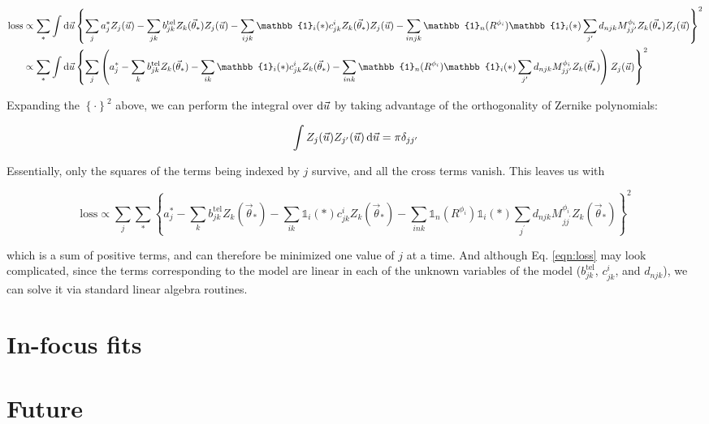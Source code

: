 \documentclass{article}
\begin{document}
\begin{equation}
\begin{align}
    \mathrm{loss}
    &\propto \sum_{\ast}
    \int \dif{\vec{u}} \left\{\sum_j a_j^\ast Z_j(\vec{u})
    - \sum_{jk} b^\mathrm{tel}_{jk} Z_k(\vec{\theta}_\ast) Z_j(\vec{u})
    - \sum_{ijk} \mathbb{1}_i(\ast) c^i_{jk} Z_k(\vec{\theta}_\ast) Z_j(\vec{u})
    - \sum_{injk} \mathbb{1}_n(R^{\phi_i}) \mathbb{1}_i(\ast) \sum_{j^\prime} d_{n j k} M^{\phi_i}_{j j^\prime} Z_k(\vec{\theta}_\ast) Z_j(\vec{u})
    \right\}^2 \\
    &\propto \sum_{\ast}
    \int \dif{\vec{u}} \left\{\sum_j\left(a_j^\ast
    - \sum_{k} b^\mathrm{tel}_{jk} Z_k(\vec{\theta}_\ast)
    - \sum_{ik} \mathbb{1}_i(\ast) c^i_{jk} Z_k(\vec{\theta}_\ast)
    - \sum_{ink} \mathbb{1}_n(R^{\phi_i}) \mathbb{1}_i(\ast) \sum_{j^\prime} d_{n j k} M^{\phi_i}_{j j^\prime} Z_k(\vec{\theta}_\ast)
    \right) Z_j(\vec{u})\right\}^2 \\
\end{align}
\end{equation}

Expanding the $\left\{\cdot\right\}^2$ above, we can perform the integral over
$\dif{\vec{u}}$ by taking advantage of the orthogonality of Zernike polynomials:

\begin{equation}
    \int Z_j(\vec{u}) Z_{j^\prime}(\vec{u}) \dif \vec{u} = \pi \delta_{j j^\prime}
\end{equation}

Essentially, only the squares of the terms being indexed by $j$ survive, and all
the cross terms vanish.  This leaves us with

\begin{equation}
    \mathrm{loss} \propto \sum_j \sum_{\ast}
    \left\{a_j^\ast
    - \sum_{k} b^\mathrm{tel}_{jk} Z_k(\vec{\theta}_\ast)
    - \sum_{ik} \mathbb{1}_i(\ast) c^i_{jk} Z_k(\vec{\theta}_\ast)
    - \sum_{ink} \mathbb{1}_n(R^{\phi_i}) \mathbb{1}_i(\ast) \sum_{j^\prime} d_{n j k} M^{\phi_i}_{j j^\prime} Z_k(\vec{\theta}_\ast)
    \right\}^2
    \label{eqn:loss}
\end{equation}

which is a sum of positive terms, and can therefore be minimized one value of
$j$ at a time.  And although Eq. \ref{eqn:loss} may look complicated, since the
terms corresponding to the model are linear in each of the unknown variables of
the model ($b^\mathrm{tel}_{jk}$, $c^i_{jk}$, and $d_{njk}$), we can solve it
via standard linear algebra routines.

\section{In-focus fits}
\section{Future}
\end{document}

